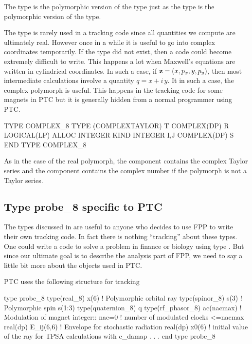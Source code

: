 \documentclass[english,12pt,article]{article} %
\begin{document}
The type  is the polymorphic version of the  type just as the  type is the polymorphic version of the  type.

The type  is rarely used in a tracking code since all quantities we compute are ultimately real. However once in a while it is useful to go into complex coordinates temporarily. If the type  did not exist, then a code could become extremely difficult to write. This happens a lot when Maxwell's equations are  written in cylindrical coordinates. In such a case, if ${\bf z}=(x,p_x,y,p_y)$, then most intermediate calculations involve a quantity $q=x+i\,y$. It in such a case, the complex polymorph is useful. This happens in the tracking code for some magnets in PTC but it is generally hidden from a normal programmer using PTC. 
 
\begin{example1}
  TYPE COMPLEX_8
    TYPE (COMPLEXTAYLOR) T 
    COMPLEX(DP) R
    LOGICAL(LP) ALLOC
    INTEGER KIND
    INTEGER I,J 
    COMPLEX(DP) S
  END TYPE COMPLEX_8
\end{example1}
  
 As in the case of the real polymorph, the  component contains the complex Taylor series and the  component contains the complex number if the polymorph is not a Taylor series. 
  
  \subsection{Type probe_8 specific to PTC}\label{sec:codetype}

The types discussed in  are useful to anyone who decides to use FPP to write their own tracking code. In fact there is nothing ``tracking'' about these types. One could write a code to solve a problem in finance or biology using  type . But since our ultimate goal is to describe the analysis part of FPP, we need to say a little bit more about the objects used in PTC.

 PTC uses the following  structure for tracking 

\begin{example1}
type probe_8
   type(real_8) x(6)     ! Polymorphic orbital ray
   type(spinor_8) s(3)   ! Polymorphic spin s(1:3)
   type(quaternion_8) q
   type(rf_phasor_8)  ac(nacmax)  ! Modulation of magnet
   integer:: nac=0 !  number of modulated clocks <=nacmax
   real(dp) E_ij(6,6)   !  Envelope for stochastic radiation
   real(dp) x0(6) ! initial value of the ray for TPSA calculations with c_damap
          .
          .
          .
end type probe_8
\end{example1}
\end{document}
